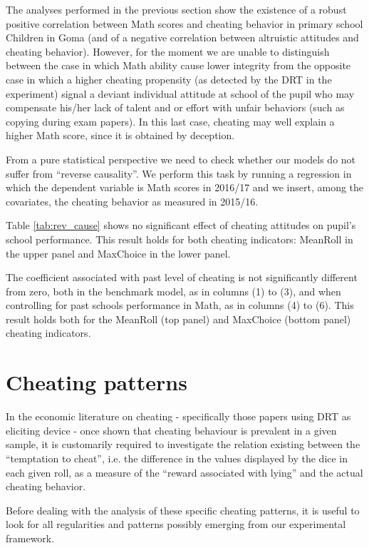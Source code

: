 \documentclass[authoryear, preprint, review, 12pt]{elsarticle}
\begin{document}
The analyses performed in the previous section show the existence of a robust positive correlation between Math scores and cheating behavior in primary school Children in Goma (and of a negative correlation between altruistic attitudes and cheating behavior).  
However, for the moment we are unable to distinguish between the case in which Math ability cause lower integrity from the opposite case in which a higher cheating propensity (as detected by the DRT in the experiment) signal a deviant individual attitude at school of the pupil who may compensate his/her lack of talent and or effort with unfair behaviors (such as copying during exam papers). In this last case, cheating may well explain a higher Math score, since it is obtained by deception.

From a pure statistical perspective we need to check whether our models do not suffer from \enquote{reverse causality}. We perform this task by running a regression in which the dependent variable is Math scores in 2016/17 and we insert, among the covariates, the cheating behavior as measured in 2015/16.

Table \ref{tab:rev_cause} shows no significant effect of cheating attitudes on pupil's school performance. This result holds for both cheating indicators: MeanRoll in the upper panel and MaxChoice in the lower panel. 



The coefficient associated with past level of cheating is not significantly different from zero, both in the benchmark model, as in columns (1) to (3), and when controlling for past schools performance in Math, as in columns (4) to (6). This result holds both for the MeanRoll (top panel) and MaxChoice (bottom panel) cheating indicators.

\section{Cheating patterns}
\label{sec:cheatpattern}
In the economic literature on cheating - specifically those papers using DRT as eliciting device \citep[such as][]{ff13,ariely2015true} - once shown that cheating behaviour is prevalent in a given sample, it is customarily required to investigate the relation existing between the \enquote{temptation to cheat}, i.e. the difference in the values displayed by the dice in each given roll, as a measure of the \enquote{reward associated with lying} and the actual cheating behavior. 

Before dealing with the analysis of these specific cheating patterns, it is useful to look for all regularities and patterns possibly emerging from our experimental framework.
\end{document}
